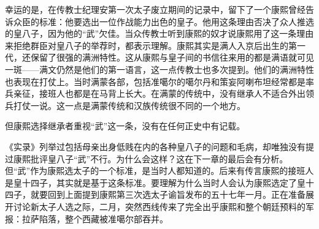 
幸运的是，在传教士纪理安第一次太子废立期间的记录中，留下了一个康熙曾经告诉众臣的标准：他要选出一位作战能力出色的皇子。他用这条理由否决了众人推选的皇八子，因为他的“武”欠佳。当众传教士听到康熙的奴才说康熙用了这一条理由来拒绝群臣对皇八子的举荐时，都表示理解。康熙其实是满人入京后出生的第一代，还保留了很强的满洲特性。这从康熙与皇子间的书信往来用的都是满语就可见一斑——满文仍然是他们的第一语言，这一点传教士也多次提到。他们的满洲特性也表现在打仗上。当时满蒙各部，包括准噶尔的噶尔丹和策妄阿喇布坦经常都是率兵亲征，接班人也都是在马背上长大。在满蒙的传统中，没有继承人不适合外出领兵打仗一说。这一点是满蒙传统和汉族传统很不同的一个地方。



但康熙选择继承者重视“武”这一条，没有在任何正史中有记载。



《实录》列举过包括母亲出身低贱在内的各种皇八子的问题和毛病，却唯独没有提过康熙批评皇八子“武”不行。为什么会这样？这在下一章的最后会有分析。但“武”作为康熙选太子的一个标准，是当时人都知道的。后来有传言康熙的接班人是皇十四子，其实就是基于这条标准。要理解为什么当时人会认为康熙选定了皇十四子，就要回到上面提到康熙第三次选太子谕旨发布的五十七年一月。正在准备展开讨论新太子人选之际，二月，突然西线传来了完全出乎康熙和整个朝廷预料的军报：拉萨陷落，整个西藏被准噶尔部吞并。


\begin{sectionnotes}


\end{sectionnotes}
